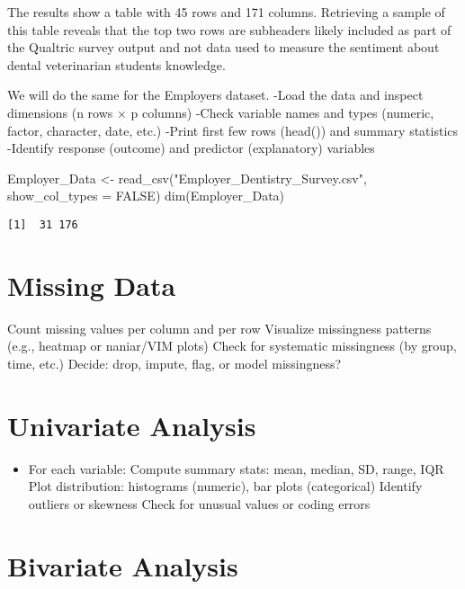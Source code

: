 \documentclass[
  11pt,
  letterpaper,
  DIV=11,
  numbers=noendperiod]{scrartcl}
\newenvironment{Shaded}{\begin{snugshade}}{\end{snugshade}}
\newcommand{\AttributeTok}[1]{\textcolor[rgb]{0.40,0.45,0.13}{#1}}
\newcommand{\ConstantTok}[1]{\textcolor[rgb]{0.56,0.35,0.01}{#1}}
\newcommand{\FunctionTok}[1]{\textcolor[rgb]{0.28,0.35,0.67}{#1}}
\newcommand{\NormalTok}[1]{\textcolor[rgb]{0.00,0.23,0.31}{#1}}
\newcommand{\OtherTok}[1]{\textcolor[rgb]{0.00,0.23,0.31}{#1}}
\newcommand{\StringTok}[1]{\textcolor[rgb]{0.13,0.47,0.30}{#1}}
\providecommand{\tightlist}{%
  \setlength{\itemsep}{0pt}\setlength{\parskip}{0pt}}\usepackage{longtable,booktabs,array}
\begin{document}
The results show a table with 45 rows and 171 columns. Retrieving a
sample of this table reveals that the top two rows are subheaders likely
included as part of the Qualtric survey output and not data used to
measure the sentiment about dental veterinarian students knowledge.

We will do the same for the Employers dataset. -Load the data and
inspect dimensions (n rows × p columns) -Check variable names and types
(numeric, factor, character, date, etc.) -Print first few rows (head())
and summary statistics -Identify response (outcome) and predictor
(explanatory) variables

\begin{Shaded}
\begin{Highlighting}[]
\NormalTok{Employer\_Data }\OtherTok{\textless{}{-}} \FunctionTok{read\_csv}\NormalTok{(}\StringTok{"Employer\_Dentistry\_Survey.csv"}\NormalTok{, }\AttributeTok{show\_col\_types =} \ConstantTok{FALSE}\NormalTok{)}
\FunctionTok{dim}\NormalTok{(Employer\_Data)}
\end{Highlighting}
\end{Shaded}

\begin{verbatim}
[1]  31 176
\end{verbatim}

\section{Missing Data}\label{missing-data}

Count missing values per column and per row Visualize missingness
patterns (e.g., heatmap or naniar/VIM plots) Check for systematic
missingness (by group, time, etc.) Decide: drop, impute, flag, or model
missingness?

\section{Univariate Analysis}\label{univariate-analysis}

\begin{itemize}
\tightlist
\item
  For each variable: Compute summary stats: mean, median, SD, range, IQR
  Plot distribution: histograms (numeric), bar plots (categorical)
  Identify outliers or skewness Check for unusual values or coding
  errors
\end{itemize}

\section{Bivariate Analysis}\label{bivariate-analysis}
\end{document}
